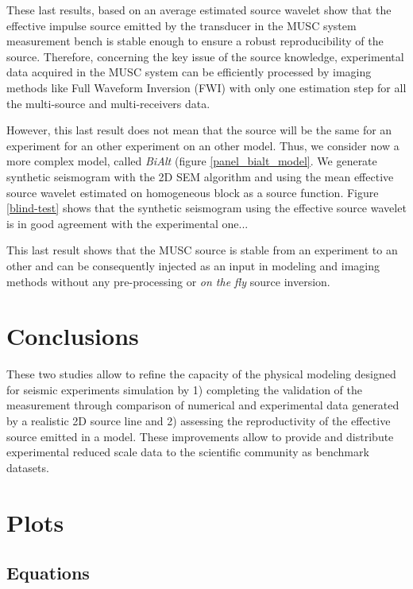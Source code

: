 \documentclass[manuscript,revised]{geophysics}
\begin{document}
\noindent These last results, based on an average estimated source wavelet show that the effective impulse source emitted by the transducer in the MUSC system measurement bench is stable enough to ensure a robust reproducibility of the source. Therefore, concerning the key issue of the source knowledge, experimental data acquired in the MUSC system can be efficiently processed by imaging methods like Full Waveform Inversion (FWI) with only one estimation step for all the multi-source and multi-receivers data.

\noindent However, this last result does not mean that the source will be the same for an experiment for an other experiment on an other model. Thus, we consider now a more complex model, called \textit{BiAlt} (figure \ref{panel_bialt_model}. We generate synthetic seismogram with the 2D SEM algorithm and using the mean effective source wavelet estimated on homogeneous block as a source function. Figure \ref{blind-test} shows that the synthetic seismogram using the effective source wavelet is in good agreement with the experimental one...

\noindent This last result shows that the MUSC source is stable from an experiment to an other and can be consequently injected as an input in modeling and imaging methods without any pre-processing or \textit{on the fly} source inversion.


\section{Conclusions}

\noindent These two studies allow to refine the capacity of the physical modeling designed for seismic experiments simulation by 1) completing the validation of the measurement through comparison of numerical and experimental data generated by a realistic 2D source line and 2) assessing the reproductivity of the effective source emitted in a model. These improvements allow to provide and distribute experimental reduced scale data to the scientific community as benchmark datasets.

\section{Plots}

\subsection*{Equations}
\end{document}
